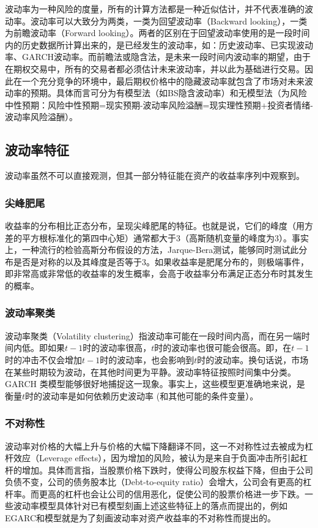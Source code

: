 \documentclass[11pt]{article}
\begin{document}
波动率为一种风险的度量，所有的计算方法都是一种近似估计，并不代表准确的波动率。波动率可以大致分为两类，一类为回望波动率（Backward looking），一类为前瞻波动率（Forward looking）。两者的区别在于回望波动率使用的是一段时间内的历史数据所计算出来的，是已经发生的波动率，如：历史波动率、已实现波动率、GARCH波动率。而前瞻法或隐含法，是未来一段时间内波动率的期望，由于在期权交易中，所有的交易者都必须估计未来波动率，并以此为基础进行交易。因此在一个充分竞争的环境中，最后期权价格中的隐藏波动率就包含了市场对未来波动率的预期。具体而言可分为有模型法（如BS隐含波动率）和无模型法（为风险中性预期：风险中性预期=现实预期-波动率风险溢酬=现实理性预期+投资者情绪-波动率风险溢酬）。

\subsection{波动率特征}

波动率虽然不可以直接观测，但其一部分特征能在资产的收益率序列中观察到。

\subsubsection{尖峰肥尾}

收益率的分布相比正态分布，呈现尖峰肥尾的特征。也就是说，它们的峰度（用方差的平方根标准化的第四中心矩）通常都大于3（高斯随机变量的峰度为3）。事实上，一种流行的检验高斯分布假设的方法，Jarque-Bera测试，能够同时测试此分布是否是对称的以及其峰度是否等于3。如果收益率是肥尾分布的，则极端事件，即非常高或非常低的收益率的发生概率，会高于收益率分布满足正态分布时其发生的概率。

\subsubsection{波动率聚类}

波动率聚类（Volatility clustering）指波动率可能在一段时间内高，而在另一端时间内低。即如果$t−1$时的波动率很高，$t$时的波动率也很可能会很高。即，在$t−1$时的冲击不仅会增加$t−1$时的波动率，也会影响到$t$时的波动率。换句话说，市场在某些时期较为波动，在其他时间更为平静。波动率特征按照时间集中分类。GARCH 类模型能够很好地捕捉这一现象。事实上，这些模型更准确地来说，是衡量$t$时的波动率是如何依赖历史波动率 (和其他可能的条件变量）。

\subsubsection{不对称性}

波动率对价格的大幅上升与价格的大幅下降翻译不同，这一不对称性过去被成为杠杆效应（Leverage effects），因为增加的风险，被认为是来自于负面冲击所引起杠杆的增加。具体而言指，当股票价格下跌时，使得公司股东权益下降，但由于公司负债不变，公司的债务股本比（Debt-to-equity ratio）会增大，公司会有更高的杠杆率。而更高的杠杆也会让公司的信用恶化，促使公司的股票价格进一步下跌。一些波动率模型具体针对已有模型刻画上述这些特征上的落点而提出的，例如EGARC和模型就是为了刻画波动率对资产收益率的不对称性而提出的。
\end{document}
